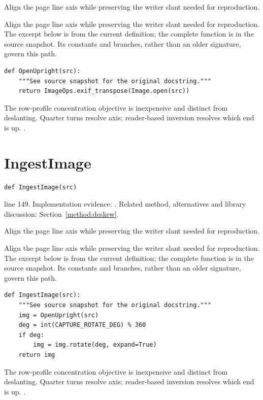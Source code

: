 Align the page line axis while preserving the writer slant needed for reproduction.


Align the page line axis while preserving the writer slant needed for reproduction. The excerpt below is from the current definition; the complete function is in the source snapshot. Its constants and branches, rather than an older signature, govern this path.


\begin{lstlisting}[style=plain]
def OpenUpright(src):
    """See source snapshot for the original docstring."""
    return ImageOps.exif_transpose(Image.open(src))
\end{lstlisting}
The row-profile concentration objective is inexpensive and distinct from deslanting. Quarter turns resolve axis; reader-based inversion resolves which end is up. \cite{postl1986,wolberg1990,opencvtransform,pillowops}.


\section{IngestImage}\label{fn:web-server:IngestImage}
\begin{lstlisting}[style=sig]
def IngestImage(src)
\end{lstlisting}
 line 149. Implementation evidence: \cite{code2026}. Related method, alternatives and library discussion: Section~\ref{method:deskew}.


Align the page line axis while preserving the writer slant needed for reproduction.


Align the page line axis while preserving the writer slant needed for reproduction. The excerpt below is from the current definition; the complete function is in the source snapshot. Its constants and branches, rather than an older signature, govern this path.


\begin{lstlisting}[style=plain]
def IngestImage(src):
    """See source snapshot for the original docstring."""
    img = OpenUpright(src)
    deg = int(CAPTURE_ROTATE_DEG) % 360
    if deg:
        img = img.rotate(deg, expand=True)
    return img
\end{lstlisting}
The row-profile concentration objective is inexpensive and distinct from deslanting. Quarter turns resolve axis; reader-based inversion resolves which end is up. \cite{postl1986,wolberg1990,opencvtransform,pillowops}.


